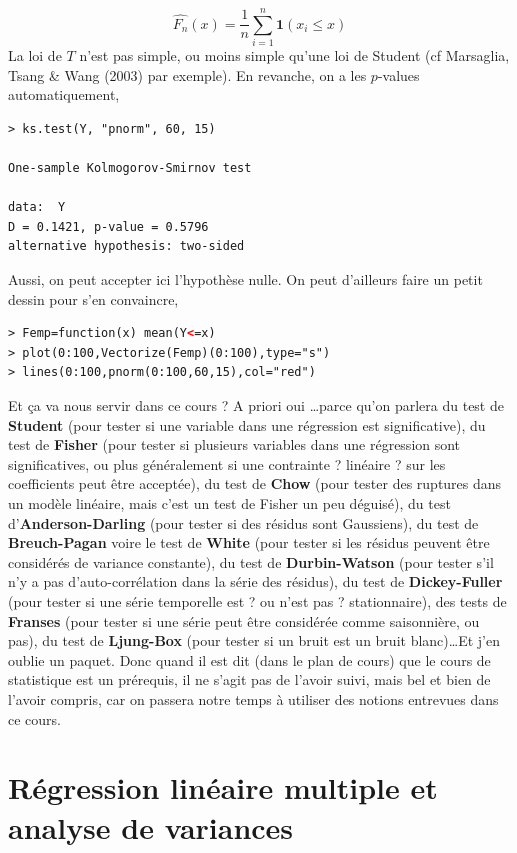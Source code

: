 $$\widehat{F_{n}}(x) = \frac{1}{n}\sum_{i=1}^{n}\mathbf{1}(x_{i}\leq x)$$
La loi de $T$ n'est pas simple, ou moins simple qu'une loi de Student (cf Marsaglia, Tsang \& Wang (2003) par exemple). En revanche, on a les $p$-values automatiquement,
\begin{lstlisting}[language=html]
> ks.test(Y, "pnorm", 60, 15)

One-sample Kolmogorov-Smirnov test

data:  Y
D = 0.1421, p-value = 0.5796
alternative hypothesis: two-sided
\end{lstlisting}
Aussi, on peut accepter ici l'hypothèse nulle. On peut d'ailleurs faire un petit dessin pour s'en convaincre,
\begin{lstlisting}[language=html]
> Femp=function(x) mean(Y<=x)
> plot(0:100,Vectorize(Femp)(0:100),type="s")
> lines(0:100,pnorm(0:100,60,15),col="red")
\end{lstlisting}
Et ça va nous servir dans ce cours ? A priori oui \dots parce qu'on parlera du test de \textbf{Student} (pour tester si une variable dans une régression est significative), du test de \textbf{Fisher} (pour tester si plusieurs variables dans une régression sont significatives, ou plus généralement si une contrainte ? linéaire ? sur les coefficients peut être acceptée), du test de \textbf{Chow} (pour tester des ruptures dans un modèle linéaire, mais c'est un test de Fisher un peu déguisé), du test d'\textbf{Anderson-Darling} (pour tester si des résidus sont Gaussiens), du test de \textbf{Breuch-Pagan} voire le test de \textbf{White} (pour tester si les résidus peuvent être considérés de variance constante), du test de \textbf{Durbin-Watson} (pour tester s'il n'y a pas d'auto-corrélation dans la série des résidus), du test de \textbf{Dickey-Fuller} (pour tester si une série temporelle est ? ou n'est pas ? stationnaire), des tests de \textbf{Franses} (pour tester si une série peut être considérée comme saisonnière, ou pas), du test de \textbf{Ljung-Box} (pour tester si un bruit est un bruit blanc)\dots Et j'en oublie un paquet. Donc quand il est dit (dans le plan de cours) que le cours de statistique est un prérequis, il ne s'agit pas de l'avoir suivi, mais bel et bien de l'avoir compris, car on passera notre temps à utiliser des notions entrevues dans ce cours.

\newpage
\section{Régression linéaire multiple et analyse de variances}

